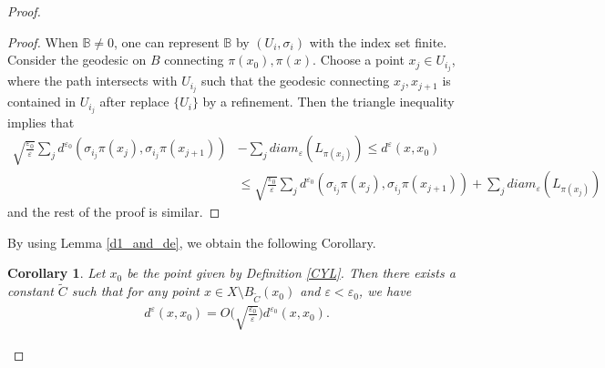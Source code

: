 \documentclass[11pt]{amsart}
\theoremstyle{plain}
\newtheorem{cor}[thm]{Corollary}
\theoremstyle{definition}
\numberwithin{equation}{section}
\renewcommand{\leq}{\leqslant}
\renewcommand{\epsilon}{\varepsilon}
\begin{document}
\begin{proof}
\begin{proof}
When $\mathbb{B}\neq 0$, one can represent $\mathbb{B}$ by $(U_i,\sigma_i)$ with the index set finite. Consider the geodesic on $B$ connecting $\pi(x_0), \pi(x)$. Choose a point $x_j\in U_{i_j}$, where the path intersects with $U_{i_j}$ such that the geodesic connecting $x_j,x_{j+1}$ is contained in $U_{i_j}$ after replace $\{U_i\}$ by a refinement. Then the triangle inequality implies that
\begin{align*}
\sqrt{\frac{\epsilon_0}{\epsilon}}\sum_j d^{\epsilon_0}(\sigma_{i_j}\pi(x_j),\sigma_{i_j}\pi(x_{j+1}))&-\sum_j diam_{\epsilon}(L_{\pi(x_j)})\leq	d^{\epsilon}(x,x_0)\\
&\leq \sqrt{\frac{\epsilon_0}{\epsilon}}\sum_j d^{\epsilon_0}(\sigma_{i_j}\pi(x_j),\sigma_{i_j}\pi(x_{j+1}))+\sum_j diam_{\epsilon}(L_{\pi(x_j)})
\end{align*} and the rest of the proof is similar. 

\end{proof}
By using Lemma \ref{d1_and_de}, we obtain the following Corollary.
\begin{cor}\label{two_side_distineq}
Let $x_0$ be the point given by Definition \ref{CYL}. Then there exists a constant $\tilde{C}$ such that for any point $x\in X\setminus B_{\tilde{C}}(x_0)$ and $\varepsilon<\epsilon_0$, we have
\begin{align}
d^{\varepsilon}(x,x_0)=O\big(\sqrt{\frac{\epsilon_0}{\varepsilon}}\big)d^{\epsilon_0}(x,x_0).
\end{align}
\end{cor}


\end{proof}
\end{document}
